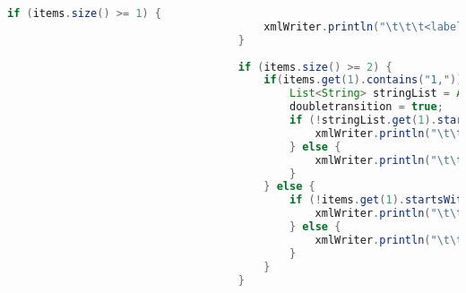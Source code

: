 \begin{lstlisting}[language=java, caption={példa unit teszteset.},captionpos=b]
									if (items.size() >= 1) {
										xmlWriter.println("\t\t\t<label kind=\"synchronisation\" x=\"" + t.getSender().getId().substring(1) + ".5\" y=\"" + t.getSender().getId().substring(1) + ".5\">" + items.get(0).replaceAll("\\(", "_").replaceAll("\\)", "_").replaceAll("\\.", "__").replaceAll("!", "not").replaceAll("&", "_and_").replaceAll("\\s", "") + "?</label>");
									}
			
									if (items.size() >= 2) {
										if(items.get(1).contains("1,")) {
											List<String> stringList = Arrays.asList(items.get(1).split("\\s*\\|\\|\\s*"));
											doubletransition = true;
											if (!stringList.get(1).startsWith("(")) {
												xmlWriter.println("\t\t\t<label kind=\"guard\" x=\"" + t.getSender().getId().substring(1) + ".5\" y=\"" + t.getSender().getId().substring(1) + ".5\">" + stringList.get(1).replaceAll("&", "&amp;&amp;").replaceAll("<", "&lt;").replaceAll(">", "&gt;").replaceAll("\\(", "").replaceAll("\\)", "").replaceAll(",", " and") + "</label>");
											} else {
												xmlWriter.println("\t\t\t<label kind=\"guard\" x=\"" + t.getSender().getId().substring(1) + ".5\" y=\"" + t.getSender().getId().substring(1) + ".5\">" + stringList.get(1).replaceAll("&", "&amp;&amp;").replaceAll("<", "&lt;").replaceAll(">", "&gt;").replaceAll(",", " and") + "</label>");
											}
										} else {
											if (!items.get(1).startsWith("(")) {
												xmlWriter.println("\t\t\t<label kind=\"guard\" x=\"" + t.getSender().getId().substring(1) + ".5\" y=\"" + t.getSender().getId().substring(1) + ".5\">" + items.get(1).replaceAll("&", "&amp;&amp;").replaceAll("<", "&lt;").replaceAll(">", "&gt;").replaceAll("\\(", "").replaceAll("\\)", "").replaceAll(",", " and") + "</label>");
											} else {
												xmlWriter.println("\t\t\t<label kind=\"guard\" x=\"" + t.getSender().getId().substring(1) + ".5\" y=\"" + t.getSender().getId().substring(1) + ".5\">" + items.get(1).replaceAll("&", "&amp;&amp;").replaceAll("<", "&lt;").replaceAll(">", "&gt;").replaceAll(",", " and") + "</label>");
											}
										}
									}
			

\end{lstlisting}
